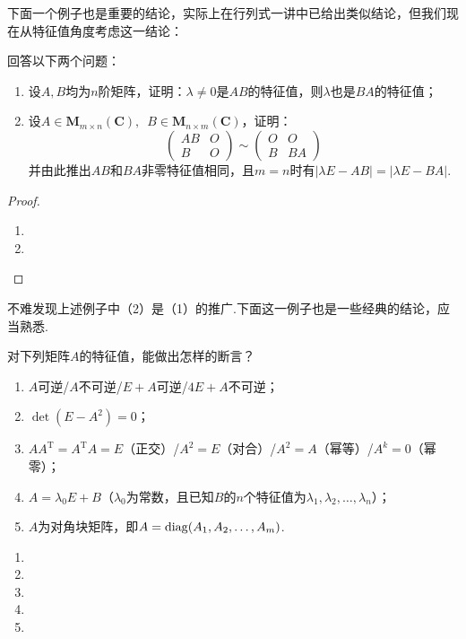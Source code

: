 下面一个例子也是重要的结论，实际上在行列式一讲中已给出类似结论，但我们现在从特征值角度考虑这一结论：
\begin{example}
    回答以下两个问题：
    \begin{enumerate}[label=(\arabic*)]
        \item 设$A,B$均为$n$阶矩阵，证明：$\lambda\neq 0$是$AB$的特征值，则$\lambda$也是$BA$的特征值；

        \item 设$A\in \mathbf{M}_{m\times n}(\mathbf{C}),\enspace B\in \mathbf{M}_{n\times m}(\mathbf{C})$，证明：
        \[ \begin{pmatrix}
            AB & O \\ B & O
        \end{pmatrix}\sim\begin{pmatrix}
            O & O \\ B & BA
        \end{pmatrix} \]
        并由此推出$AB$和$BA$非零特征值相同，且$m=n$时有$|\lambda E-AB|=|\lambda E-BA|$.
    \end{enumerate}
\end{example}
\begin{proof}
\begin{enumerate}[label=(\arabic*)]
    \item 
    \item 
\end{enumerate}
\end{proof}

不难发现上述例子中（2）是（1）的推广.下面这一例子也是一些经典的结论，应当熟悉.
\begin{example}
    对下列矩阵$A$的特征值，能做出怎样的断言？
    \begin{enumerate}[label=(\arabic*)]
        \item $A$可逆/$A$不可逆/$E+A$可逆/$4E+A$不可逆；

        \item $\det(E-A^2)=0$；

        \item $AA^\mathrm{T}=A^\mathrm{T}A=E$（正交）/$A^2=E$（对合）/$A^2=A$（幂等）/$A^k=0$（幂零）；

        \item $A=\lambda_0E+B$（$\lambda_0$为常数，且已知$B$的$n$个特征值为$\lambda_1,\lambda_2,\ldots,\lambda_n$）；

        \item $A$为对角块矩阵，即$A=\operatorname{diag}(A_1,A_2,\ldots,A_m)$.
    \end{enumerate}
\end{example}
\begin{solution}
    \begin{enumerate}[label=(\arabic*)]
        \item 
        \item 
        \item 
        \item 
        \item 
    \end{enumerate}
\end{solution}

